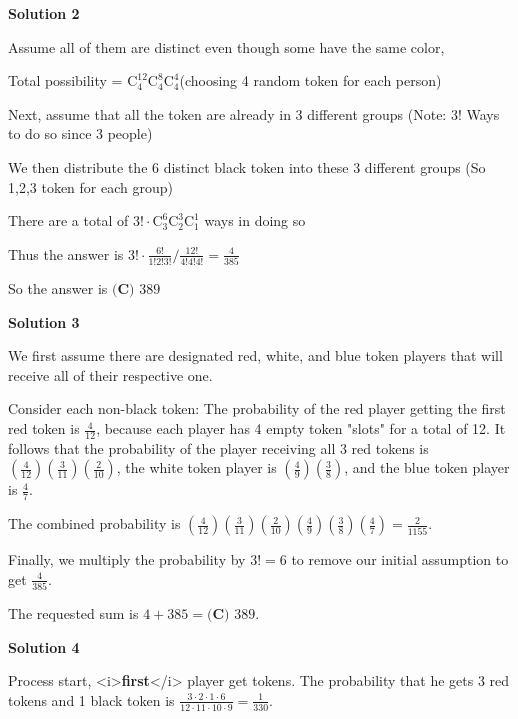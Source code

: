 \begin{enumerate}
\textbf{Solution 2}

Assume all of them are distinct even though some have the same color,

 Total possibility = $\mathrm{C}_{4}^{12}\mathrm{C}_{4}^{8}\mathrm{C}_{4}^{4}$(choosing 4 random token for each person)

 Next, assume that all the token are already in 3 different groups (Note: 3! Ways to do so since 3 people)

 We then distribute the 6 distinct black token into these 3 different groups (So 1,2,3 token for each group)

 There are a total of $3!  \cdot  \mathrm{C}_{3}^{6}\mathrm{C}_{2}^{3}\mathrm{C}_{1}^{1}$ ways in doing so

 Thus the answer is $3! \cdot \frac{6!}{1!2!3!}/\frac{12!}{4!4!4!}=\frac{4}{385}$

 So the answer is $\boxed{\textbf{(C) }389}$




\textbf{Solution 3}

We first assume there are designated red, white, and blue token players that will receive all of their respective one.

 Consider each non-black token: The probability of the red player getting the first red token is $\frac{4}{12}$, because each player has 4 empty token "slots" for a total of 12. It follows that the probability of the player receiving all 3 red tokens is $\left(\frac{4}{12}\right)\left(\frac{3}{11}\right)\left(\frac{2}{10}\right)$, the white token player is $\left(\frac{4}{9}\right)\left(\frac{3}{8}\right)$, and the blue token player is $\frac{4}{7}$.

 The combined probability is $\left(\frac{4}{12}\right)\left(\frac{3}{11}\right)\left(\frac{2}{10}\right)\left(\frac{4}{9}\right)\left(\frac{3}{8}\right)\left(\frac{4}{7}\right)=\frac{2}{1155}$.

 Finally, we multiply the probability by $3!=6$ to remove our initial assumption to get $\frac{4}{385}$.

 The requested sum is $4+385=\boxed{\textbf{(C) }389}$.

 



\textbf{Solution 4}

Process start, <i>\textbf{first}</i> player get tokens.  The probability that he gets 3 red tokens and 1 black token is $\frac{3 \cdot 2 \cdot 1 \cdot 6}{12 \cdot 11 \cdot 10 \cdot 9} = \frac {1}{330}.$


\end{enumerate}
